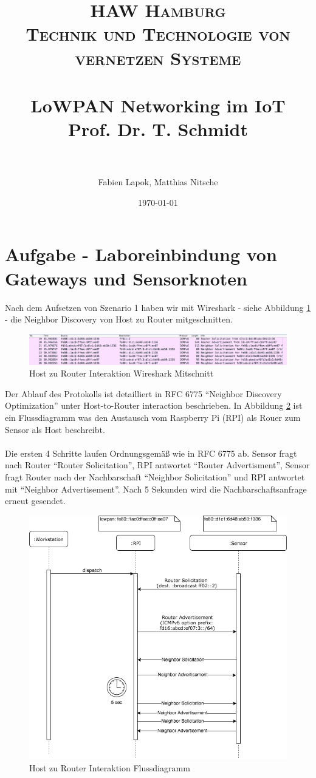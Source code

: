\documentclass[paper=a4, fontsize=11pt]{scrartcl} %
\title {
  \normalfont \normalsize
  \textsc{HAW Hamburg} \\ [25pt] %
  \textsc{Technik und Technologie von vernetzen Systeme} \\ [15pt]
  \horrule{0.5pt} \\[0.4cm] %
  \huge LoWPAN Networking im IoT \\ [15pt] %
  \small  Prof. Dr. T. Schmidt \\
  \horrule{2pt} \\[0.5cm] %
}
\author{Fabien Lapok, Matthias Nitsche}
\date{\normalsize\today}
\numberwithin{equation}{section} %
\numberwithin{figure}{section} %
\numberwithin{table}{section} %
\begin{document}
\maketitle

\section{Aufgabe - Laboreinbindung von Gateways und Sensorknoten}

Nach dem Aufsetzen von Szenario 1 haben wir mit Wireshark - siehe Abbildung \ref{fig:hrwireshark} - die Neighbor Discovery von Host zu Router mitgeschnitten.

\begin{figure}[H]
  \centering
  \includegraphics[width=\linewidth]{imgs/host-to-router-interaction-wireshark.png}
  \caption{Host zu Router Interaktion Wireshark Mitschnitt}
  \label{fig:hrwireshark}
\end{figure}

Der Ablauf des Protokolls ist detailliert in RFC 6775 ``Neighbor Discovery Optimization'' unter Host-to-Router interaction beschrieben. In Abbildung \ref{fig:hrfluss} ist ein Flussdiagramm was den Austausch vom Raspberry Pi (RPI) als Rouer zum Sensor als Host beschreibt.
\\
\\
Die ersten 4 Schritte laufen Ordnungsgemäß wie in RFC 6775 ab. Sensor fragt nach Router ``Router Solicitation'', RPI antwortet ``Router Advertisment'', Sensor fragt Router nach der Nachbarschaft ``Neighbor Solicitation'' und RPI antwortet mit ``Neighbor Advertisement''. Nach 5 Sekunden wird die Nachbarschaftsanfrage erneut gesendet.

\begin{figure}[H]
  \centering
  \includegraphics[width=0.7\linewidth,height=0.7\columnwidth]{imgs/host-to-router-interaction.png}
  \caption{Host zu Router Interaktion Flussdiagramm}
  \label{fig:hrfluss}
\end{figure}
\end{document}

